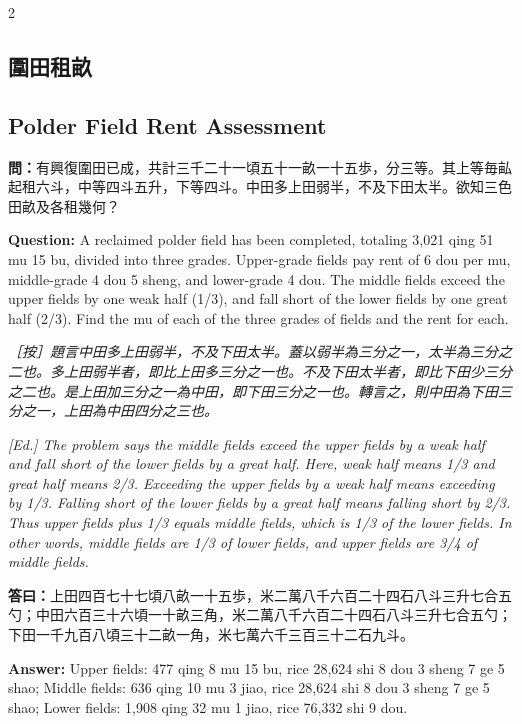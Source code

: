 \documentclass[11pt,a4paper]{article}
\newcommand{\QuestionText}[1]{\par\noindent\textbf{\color{problemcolor}問：}#1\par}
\newcommand{\AnswerText}[1]{\par\noindent\textbf{\color{answercolor}答曰：}#1\par}
\newcommand{\EdNoteText}[1]{\par\noindent\textit{\color{ednotecolor}［按］#1}\par}
\newcommand{\QuestionEn}[1]{\par\noindent\textbf{\color{problemcolor}Question:} #1\par}
\newcommand{\AnswerEn}[1]{\par\noindent\textbf{\color{answercolor}Answer:} #1\par}
\newcommand{\EdNoteEn}[1]{\par\noindent\textit{\color{ednotecolor}[Ed.] #1}\par}
\begin{document}
\begin{paracol}{2}

\subsection*{\color{sectioncolor}圍田租畝}
\switchcolumn
\subsection*{\color{sectioncolor}Polder Field Rent Assessment}
\switchcolumn*

\QuestionText{有興復圍田已成，共計三千二十一頃五十一畝一十五歩，分三等。其上等毎畆起租六斗，中等四斗五升，下等四斗。中田多上田弱半，不及下田太半。欲知三色田畝及各租幾何？}
\switchcolumn
\QuestionEn{A reclaimed polder field has been completed, totaling 3,021 qing 51 mu 15 bu, divided into three grades. Upper-grade fields pay rent of 6 dou per mu, middle-grade 4 dou 5 sheng, and lower-grade 4 dou. The middle fields exceed the upper fields by one weak half (1/3), and fall short of the lower fields by one great half (2/3). Find the mu of each of the three grades of fields and the rent for each.}
\switchcolumn*

\EdNoteText{題言中田多上田弱半，不及下田太半。蓋以弱半為三分之一，太半為三分之二也。多上田弱半者，即比上田多三分之一也。不及下田太半者，即比下田少三分之二也。是上田加三分之一為中田，即下田三分之一也。轉言之，則中田為下田三分之一，上田為中田四分之三也。}
\switchcolumn
\EdNoteEn{The problem says the middle fields exceed the upper fields by a weak half and fall short of the lower fields by a great half. Here, weak half means 1/3 and great half means 2/3. Exceeding the upper fields by a weak half means exceeding by 1/3. Falling short of the lower fields by a great half means falling short by 2/3. Thus upper fields plus 1/3 equals middle fields, which is 1/3 of the lower fields. In other words, middle fields are 1/3 of lower fields, and upper fields are 3/4 of middle fields.}
\switchcolumn*

\AnswerText{上田四百七十七頃八畝一十五歩，米二萬八千六百二十四石八斗三升七合五勺；中田六百三十六頃一十畝三角，米二萬八千六百二十四石八斗三升七合五勺；下田一千九百八頃三十二畝一角，米七萬六千三百三十二石九斗。}
\switchcolumn
\AnswerEn{Upper fields: 477 qing 8 mu 15 bu, rice 28,624 shi 8 dou 3 sheng 7 ge 5 shao; Middle fields: 636 qing 10 mu 3 jiao, rice 28,624 shi 8 dou 3 sheng 7 ge 5 shao; Lower fields: 1,908 qing 32 mu 1 jiao, rice 76,332 shi 9 dou.}
\switchcolumn*


\end{paracol}
\end{document}
